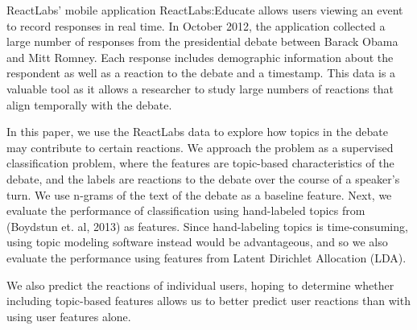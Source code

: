 
ReactLabs' mobile application ReactLabs:Educate allows users viewing an event to record responses in real time. In October 2012, the application collected a large number of responses from the presidential debate between Barack Obama and Mitt Romney. Each response includes demographic information about the respondent as well as a reaction to the debate and a timestamp. This data is a valuable tool as it allows a researcher to study large numbers of reactions that align temporally with the debate.

In this paper, we use the ReactLabs data to explore how topics in the debate may contribute to certain reactions. We approach the problem as a supervised classification problem, where the features are topic-based characteristics of the debate, and the labels are reactions to the debate over the course of a speaker's turn. We use n-grams of the text of the debate as a baseline feature. Next, we evaluate the performance of classification using hand-labeled topics from (Boydstun et. al, 2013) as features. Since hand-labeling topics is time-consuming, using topic modeling software instead would be advantageous, and so we also evaluate the performance using features from Latent Dirichlet Allocation (LDA).

We also predict the reactions of individual users, hoping to determine whether including topic-based features allows us to better predict user reactions than with using user features alone.